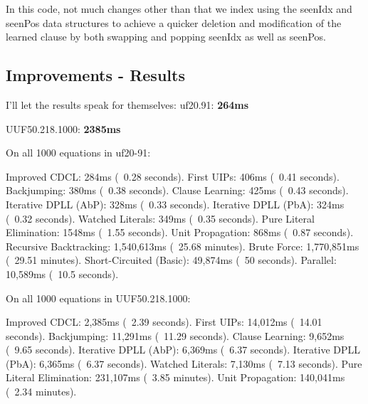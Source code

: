 In this code, not much changes other than that we index using the seenIdx and seenPos
data structures to achieve a quicker deletion and modification of the learned clause
by both swapping and popping seenIdx as well as seenPos.

\subsection{Improvements - Results}

I'll let the results speak for themselves:
\noindent
uf20.91: \textbf{264ms}

\noindent
UUF50.218.1000: \textbf{2385ms}

\begin{FVerbatim}
On all 1000 equations in uf20-91:

Improved CDCL:             284ms (~0.28 seconds).
First UIPs:                406ms (~0.41 seconds).
Backjumping:               380ms (~0.38 seconds).
Clause Learning:           425ms (~0.43 seconds).
Iterative DPLL (AbP):      328ms (~0.33 seconds).
Iterative DPLL (PbA):      324ms (~0.32 seconds).
Watched Literals:          349ms (~0.35 seconds).
Pure Literal Elimination:  1548ms (~1.55 seconds).
Unit Propagation:          868ms (~0.87 seconds).
Recursive Backtracking:    1,540,613ms (~25.68 minutes).
Brute Force:               1,770,851ms (~29.51 minutes).
Short-Circuited (Basic):   49,874ms (~50 seconds).
Parallel:                  10,589ms (~10.5 seconds).

On all 1000 equations in UUF50.218.1000:

Improved CDCL:            2,385ms (~2.39 seconds).
First UIPs:               14,012ms (~14.01 seconds).
Backjumping:              11,291ms (~11.29 seconds).
Clause Learning:          9,652ms (~9.65 seconds).
Iterative DPLL (AbP):     6,369ms (~6.37 seconds).
Iterative DPLL (PbA):     6,365ms (~6.37 seconds).
Watched Literals:         7,130ms (~7.13 seconds).
Pure Literal Elimination: 231,107ms (~3.85 minutes).
Unit Propagation:         140,041ms (~2.34 minutes).
\end{FVerbatim}
